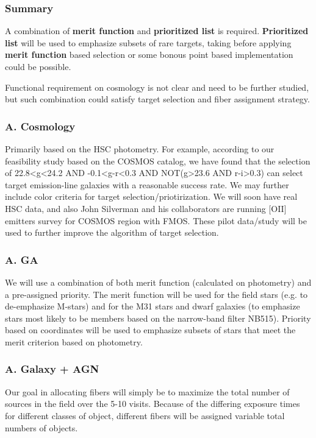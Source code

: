 \documentclass[a4paper,notitlepage]{article}
\begin{document}
\subsubsection{Summary}

A combination of {\bf merit function} and {\bf prioritized list} is 
required. {\bf Prioritized list} will be used to emphasize subsets of rare 
targets, taking before applying {\bf merit function} based selection or some 
bonous point based implementation could be possible. 

Functional requirement on cosmology is not clear and need to be further 
studied, but such combination could satisfy target selection and fiber 
assignment strategy. 

\subsubsection{A. Cosmology}
Primarily based on the HSC photometry. For example, according to
our feasibility study based on the COSMOS catalog, we have found that
the selection of 22.8<g<24.2 AND -0.1<g-r<0.3 AND NOT(g>23.6 AND
r-i>0.3) can select target emission-line galaxies with a reasonable
success rate. We may further include color criteria for target
selection/priotirization.  We will soon have real HSC data, and also
John Silverman and his collaborators are running [OII] emitters survey
for COSMOS region with FMOS. These pilot data/study will be used to
further improve the algorithm of target selection.

\subsubsection{A. GA}
We will use a combination of both merit function (calculated on
photometry) and a pre-assigned priority. The merit function will be
used for the field stars (e.g. to de-emphasize M-stars) and for the
M31 stars and dwarf galaxies (to emphasize stars most likely to be
members based on the narrow-band filter NB515). Priority based on
coordinates will be used to emphasize subsets of stars that meet the merit
criterion based on photometry. 

\subsubsection{A. Galaxy + AGN}

Our goal in allocating fibers will simply be to maximize the total 
number of sources in the field over the 5-10 visits.  Because of 
the differing exposure times for different classes of object, different 
fibers will be assigned variable total numbers of objects.
\end{document}
